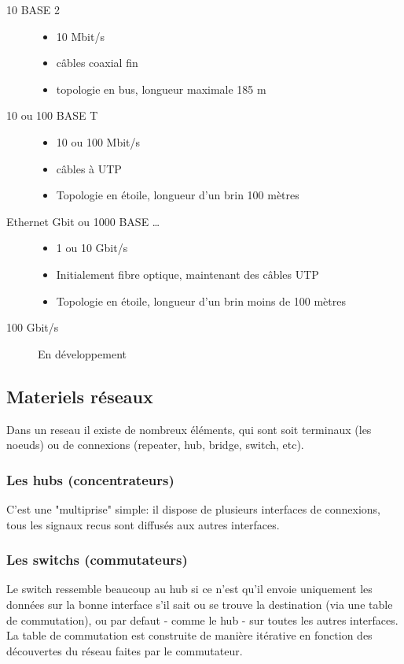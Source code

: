 \documentclass[a4paper, 12pt, french]{article}
\begin{document}
	\begin{description}
		\item[10 BASE 2]
		\begin{itemize}
			\item 10 Mbit/s
			\item câbles coaxial fin
			\item topologie en bus, longueur maximale 185 m
		\end{itemize}
		\item[10 ou 100 BASE T]
		\begin{itemize}
			\item 10 ou 100 Mbit/s
			\item câbles à UTP
			\item Topologie en étoile, longueur d'un brin 100 mètres
		\end{itemize}
		\item[Ethernet Gbit ou 1000 BASE …]
		\begin{itemize}
			\item 1 ou 10 Gbit/s
			\item Initialement fibre optique, maintenant des câbles UTP
			\item Topologie en étoile, longueur d'un brin moins de 100 mètres
		\end{itemize}
		\item[100 Gbit/s] En développement
	\end{description}

	\subsection{Materiels réseaux}

	Dans un reseau il existe de nombreux éléments, qui sont soit terminaux (les noeuds) ou de connexions (repeater, hub, bridge, switch, etc).

	\subsubsection{Les hubs (concentrateurs)}

	C'est une "multiprise" simple: il dispose de plusieurs interfaces de connexions, tous les signaux recus sont diffusés aux autres interfaces.

	\subsubsection{Les switchs (commutateurs)}

	Le switch ressemble beaucoup au hub si ce n'est qu'il envoie uniquement les données sur la bonne interface s'il sait ou se trouve la destination (via une table de commutation), ou par defaut - comme le hub - sur toutes les autres interfaces. La table de commutation est construite de manière itérative en fonction des découvertes du réseau faites par le commutateur.\\
\end{document}
